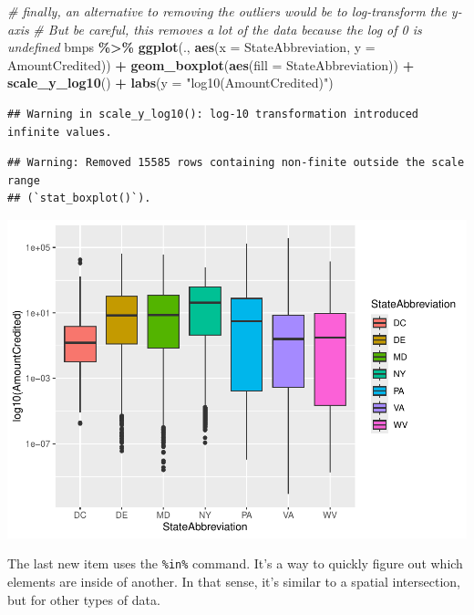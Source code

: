 \documentclass[]{article}
\newenvironment{Shaded}{\begin{snugshade}}{\end{snugshade}}
\newcommand{\AttributeTok}[1]{\textcolor[rgb]{0.13,0.29,0.53}{#1}}
\newcommand{\CommentTok}[1]{\textcolor[rgb]{0.56,0.35,0.01}{\textit{#1}}}
\newcommand{\FunctionTok}[1]{\textcolor[rgb]{0.13,0.29,0.53}{\textbf{#1}}}
\newcommand{\NormalTok}[1]{#1}
\newcommand{\SpecialCharTok}[1]{\textcolor[rgb]{0.81,0.36,0.00}{\textbf{#1}}}
\newcommand{\StringTok}[1]{\textcolor[rgb]{0.31,0.60,0.02}{#1}}
\begin{document}
\begin{Shaded}
\begin{Highlighting}[]
\CommentTok{\# finally, an alternative to removing the outliers would be to log{-}transform the y{-}axis}
\CommentTok{\# But be careful, this removes a lot of the data because the log of 0 is undefined}
\NormalTok{bmps }\SpecialCharTok{\%\textgreater{}\%} \FunctionTok{ggplot}\NormalTok{(., }\FunctionTok{aes}\NormalTok{(}\AttributeTok{x =}\NormalTok{ StateAbbreviation, }\AttributeTok{y =}\NormalTok{ AmountCredited)) }\SpecialCharTok{+}
  \FunctionTok{geom\_boxplot}\NormalTok{(}\FunctionTok{aes}\NormalTok{(}\AttributeTok{fill =}\NormalTok{ StateAbbreviation)) }\SpecialCharTok{+}
  \FunctionTok{scale\_y\_log10}\NormalTok{() }\SpecialCharTok{+}
  \FunctionTok{labs}\NormalTok{(}\AttributeTok{y =} \StringTok{"log10(AmountCredited)"}\NormalTok{)}
\end{Highlighting}
\end{Shaded}

\begin{verbatim}
## Warning in scale_y_log10(): log-10 transformation introduced infinite values.
\end{verbatim}

\begin{verbatim}
## Warning: Removed 15585 rows containing non-finite outside the scale range
## (`stat_boxplot()`).
\end{verbatim}

\includegraphics{lab02_files/figure-latex/review3-4.pdf}

The last new item uses the \texttt{\%in\%} command. It's a way to
quickly figure out which elements are inside of another. In that sense,
it's similar to a spatial intersection, but for other types of data.
\end{document}

